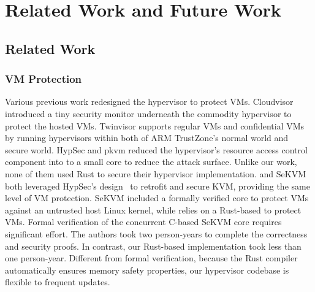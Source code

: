 \chapter{Related Work and Future Work}
\label{sec:rwfw}

\section{Related Work}

\subsection{VM Protection}
Various previous work redesigned the hypervisor to protect VMs.
Cloudvisor \cite{zhang2011cloudvisor, zeyu20usenix} introduced a tiny security
monitor underneath the commodity hypervisor to protect the hosted VMs.
Twinvisor \cite{lisosp21} supports regular VMs and confidential VMs by running
hypervisors within both of ARM TrustZone's normal world and secure world.
HypSec \cite{hypsec} and pkvm \cite{pkvm} reduced the hypervisor's resource access
control component into to a small core to reduce the attack surface.
Unlike our work, none of them used Rust to secure their hypervisor
implementation.
\rustsec{} and SeKVM~\cite{sekvm} both leveraged HypSec's design~\cite{hypsec}
to retrofit and secure KVM, providing the same level of VM protection. SeKVM
included a formally verified core to protect VMs against an untrusted host Linux
kernel, while \rustsec{} relies on a Rust-based \rustcore{} to protect VMs.
Formal verification of the concurrent C-based SeKVM core requires significant
effort. The authors took two person-years to complete the correctness and
security proofs.
In contrast, our Rust-based implementation took less than one person-year.
Different from formal verification, because the Rust compiler automatically
ensures memory safety properties, our hypervisor codebase is flexible to
frequent updates.

